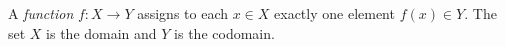 
A \emph{function} $f:X\to Y$ assigns to each $x\in X$ exactly one element $f(x)\in Y$. The set $X$ is the domain and $Y$ is the codomain.
